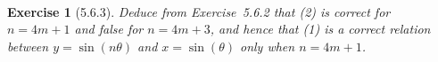 \documentclass[12pt]{article}
\newcommand{\XB}{\color{black}}
\newcommand{\XBB}{\color{blue}}
\theoremstyle{plain}
\newtheorem{ex}{Exercise}
\begin{document}
\newpage


\XBB\hrulefill\XB \\
\begin{ex} [5.6.3]
  Deduce from Exercise~5.6.2 that (2) is correct for $ n = 4m + 1 $ and false for $ n = 4m + 3 $, and hence that (1) is a correct relation between $ y = \sin(n\theta) $ and $ x = \sin(\theta) $ only when $ n = 4m + 1 $.
\end{ex}
\XBB\hrulefill\XB \\
\end{document}
